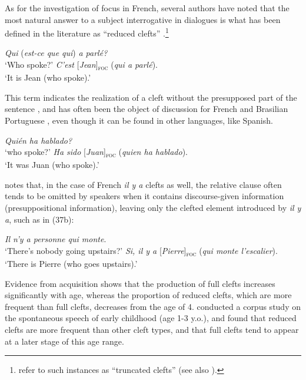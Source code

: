 As for the investigation of focus in French, several authors have noted that the most natural answer to a subject interrogative in dialogues is what has been defined in the literature as “reduced clefts” \parencite{belletti2005answering, belletti2008cp, belletti2008answering}.\footnote{\textcite[538]{doetjes2004cleft} refer to such instances as ``truncated clefts” (see also \cite{buring1998identity, hedberg2000referential}).} 

 \ea \label{ex39}
\ea  \textit{Qui} (\textit{est-ce que qui}) \textit{a parlé?}\\
 `Who spoke?'
\ex \textit{C'est} {[\textit{Jean}]\textsubscript{\textsc{foc}}} \normalsize (\textit{qui a parlé}).\\
`It is Jean (who spoke).' \hfill \parencite[192]{belletti2008cp}    
\z \z


This term indicates the realization of a cleft without the presupposed part of the sentence \parencite{frascarelli2013pseudo}, and has often been the object of discussion for French and Brasilian Portuguese \parencite{lobo20172}, even though it can be found in other languages, like Spanish.

\ea \label{ex40}
\ea  \textit{Quién ha hablado?}\\
 `who spoke?'
\ex \textit{Ha sido} {[\textit{Juan}]\textsubscript{\textsc{foc}}} \normalsize (\textit{quien ha hablado}).\\
`It was Juan (who spoke).'

\z \z


\textcite{karssenberg2017oiseaux} notes that, in the case of French \textit{il y a} clefts as well, the relative clause often tends to be omitted by speakers when it contains discourse-given information (presuppositional information), leaving only the clefted element introduced by \textit{il y a}, such as in (37b):


\ea \label{ex41}
\ea  \textit{Il n’y a personne qui monte}.\\
 `There's nobody going upstairs?'
\ex \textit{Si, il y a} {[\textit{Pierre}]\textsubscript{\textsc{foc}}} \normalsize (\textit{qui monte l’escalier}).\\
`There is Pierre (who goes upstairs).' \hfill \parencite[202]{karssenberg2017oiseaux}    
\z \z


Evidence from acquisition \parencite{lobo2019effects} shows that the production of full clefts increases significantly with age, whereas the proportion of reduced clefts, which are more frequent than full clefts, decreases from the age of 4. \textcite{lahousse2019emergence} conducted a corpus study on the spontaneous speech of early childhood (age 1-3 y.o.), and found that reduced clefts are more frequent than other cleft types, and that full clefts tend to appear at a later stage of this age range. 

